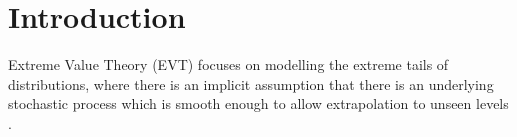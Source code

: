 \documentclass{article}
\numberwithin{equation}{section}
\begin{document}
% 
% 
% 
% 

\section{Introduction}\label{sec:intro}


Extreme Value Theory (EVT) focuses on modelling the extreme tails of distributions, where there is an implicit assumption that there is an underlying stochastic process which is smooth enough to allow extrapolation to unseen levels \citep{Coles2001}.
\end{document}
